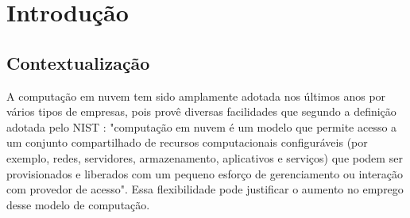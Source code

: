 \chapter{\label{chap:intro}Introdução}




%
%
%
%

\section{Contextualização}

A computação em nuvem tem sido amplamente adotada nos últimos anos por vários tipos de empresas, pois provê diversas facilidades que segundo a definição adotada 
pelo NIST \cite{Mell:2011}: "computação em nuvem é um modelo que permite acesso a um conjunto compartilhado de recursos computacionais configuráveis (por exemplo, redes, servidores, armazenamento, aplicativos e serviços) que podem ser provisionados e liberados  com um pequeno esforço de gerenciamento ou interação com provedor de acesso". Essa flexibilidade pode justificar o aumento no emprego desse modelo de computação.

